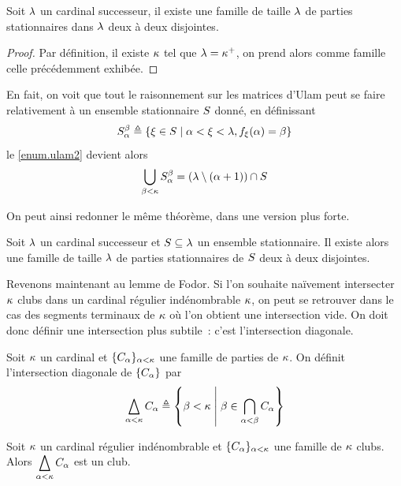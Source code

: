 \begin{theorem}
  Soit $\lambda$ un cardinal successeur, il existe une famille de taille
  $\lambda$ de parties stationnaires dans $\lambda$ deux à deux disjointes.
\end{theorem}

\begin{proof}
  Par définition, il existe $\kappa$ tel que $\lambda = \kappa^{+}$, on prend
  alors comme famille celle précédemment exhibée.
\end{proof}

En fait, on voit que tout le raisonnement sur les matrices d'Ulam peut se faire
relativement à un ensemble stationnaire $S$ donné, en définissant
\[S_{\alpha}^{\beta} \triangleq
\left\{ \xi \in S \;\middle\vert\; \alpha < \xi < \lambda,f_\xi(\alpha) = \beta \right\}\]
le \cref{enum.ulam2} devient alors
\[\bigcup_{\beta < \kappa} S_{\alpha}^{\beta} =
(\lambda \setminus (\alpha +1))\cap S\]

On peut ainsi redonner le même théorème, dans une version plus forte.

\begin{theorem}
  Soit $\lambda$ un cardinal successeur et $S\subseteq\lambda$ un ensemble
  stationnaire. Il existe alors une famille de taille $\lambda$ de parties
  stationnaires de $S$ deux à deux disjointes.
\end{theorem}

Revenons maintenant au lemme de Fodor. Si l'on souhaite naïvement intersecter
$\kappa$ clubs dans un cardinal régulier indénombrable $\kappa$, on peut
se retrouver dans le cas des segments terminaux de $\kappa$ où l'on obtient une
intersection vide. On doit donc définir une intersection plus subtile~: c'est
l'intersection diagonale.

\begin{definition}
  Soit $\kappa$ un cardinal et $\{C_\alpha\}_{\alpha < \kappa}$ une famille
  de parties de $\kappa$. On définit l'intersection diagonale de
  $\{C_\alpha\}$ par
  \[\bigtriangleup_{\alpha < \kappa} C_\alpha \triangleq
  \left\{ \beta <\kappa \;\middle\vert\; \beta\in\bigcap_{\alpha < \beta} C_\alpha \right\}\]
\end{definition}

\begin{proposition}
  Soit $\kappa$ un cardinal régulier indénombrable et
  $\{C_\alpha\}_{\alpha < \kappa}$ une famille de $\kappa$ clubs. Alors
  $\displaystyle\bigtriangleup_{\alpha < \kappa} C_\alpha$ est un club.
\end{proposition}

